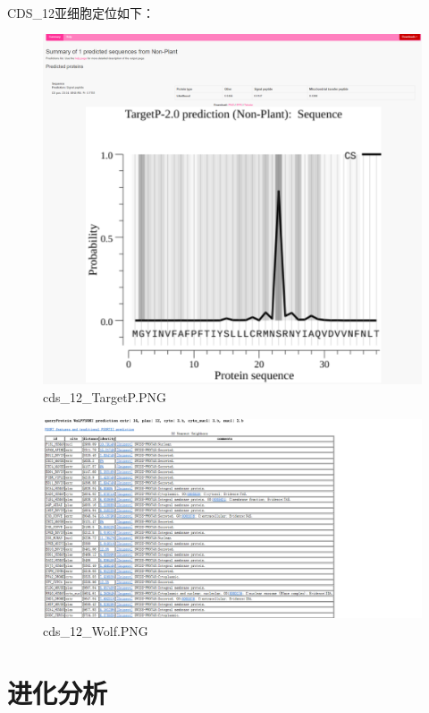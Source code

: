 \documentclass[supercite]{HustGraduPaper}
\begin{document}
	\paragraph{}\label{subpara:subpara}CDS\_12亚细胞定位如下：
	\begin{figure}[H]
		\centering
		\includegraphics[width=1\textwidth]{./material/practice2/cds_12/TargetP.png}
		\caption{cds\_12\_TargetP.PNG}
	\end{figure}
	\begin{figure}[H]
		\centering
		\includegraphics[width=1\textwidth]{./material/practice2/cds_12/wolf.png}
		\caption{cds\_12\_Wolf.PNG}
	\end{figure}


\section{进化分析}
\end{document}
